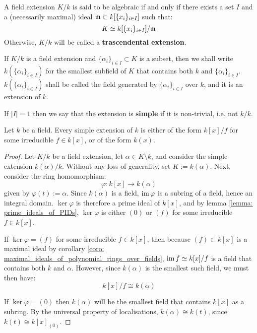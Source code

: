         \begin{definition} \label{def: algebraic_and_transcendental_extensions}
            A field extension $K/k$ is said to be algebraic if and only if there exists a set $I$ and a (necessarily maximal) ideal $\mathfrak{m} \subset k[\{x_i\}_{i \in I}]$ such that:
                $$K \simeq k[\{x_i\}_{i \in I}]/\mathfrak{m}$$
            Otherwise, $K/k$ will be called a \textbf{trascendental extension}.
        \end{definition}
        \begin{convention}
            If $K/k$ is a field extension and $\{\alpha_i\}_{i \in I} \subset K$ is a subset, then we shall write $k(\{\alpha_i\}_{i \in I})$ for the smallest subfield of $K$ that contains both $k$ and $\{\alpha_i\}_{i \in I}$. $k(\{\alpha_i\}_{i \in I})$ shall be called the field generated by $\{\alpha_i\}_{i \in I}$ over $k$, and it is an extension of $k$. 

            If $|I| = 1$ then we say that the extension is \textbf{simple} if it is non-trivial, i.e. not $k/k$.
        \end{convention}
        \begin{lemma} \label{lemma: classification_of_simple_extensions}
            Let $k$ be a field. Every simple extension of $k$ is either of the form $k[x]/f$ for some irreducible $f \in k[x]$, or of the form $k(x)$.
        \end{lemma}
            \begin{proof}
                Let $K/k$ be a field extension, let $\alpha \in K \setminus k$, and consider the simple extension $k(\alpha)/k$. Without any loss of generality, set $K := k(\alpha)$. Next, consider the ring homomorphism:
                    $$\varphi: k[x] \to k(\alpha)$$
                given by $\varphi(t) := \alpha$. Since $k(\alpha)$ is a field, $\operatorname{im} \varphi$ is a subring of a field, hence an integral domain. $\ker \varphi$ is therefore a prime ideal of $k[x]$, and by lemma \ref{lemma: prime_ideals_of_PIDs}, $\ker \varphi$ is either $(0)$ or $(f)$ for some irreducible $f \in k[x]$. 

                If $\ker \varphi = (f)$ for some irreducible $f \in k[x]$, then because $(f) \subset k[x]$ is a maximal ideal by corollary \ref{coro: maximal_ideals_of_polynomial_rings_over_fields}, $\operatorname{im} f \simeq k[x]/f$ is a field that contains both $k$ and $\alpha$. However, since $k(\alpha)$ is the smallest such field, we must then have:
                    $$k[x]/f \cong k(\alpha)$$

                If $\ker \varphi = (0)$ then $k(\alpha)$ will be the smallest field that contains $k[x]$ as a subring. By the universal property of localisations, $k(\alpha) \cong k(t)$, since $k(t) \cong k[x]_{(0)}$.
            \end{proof}
